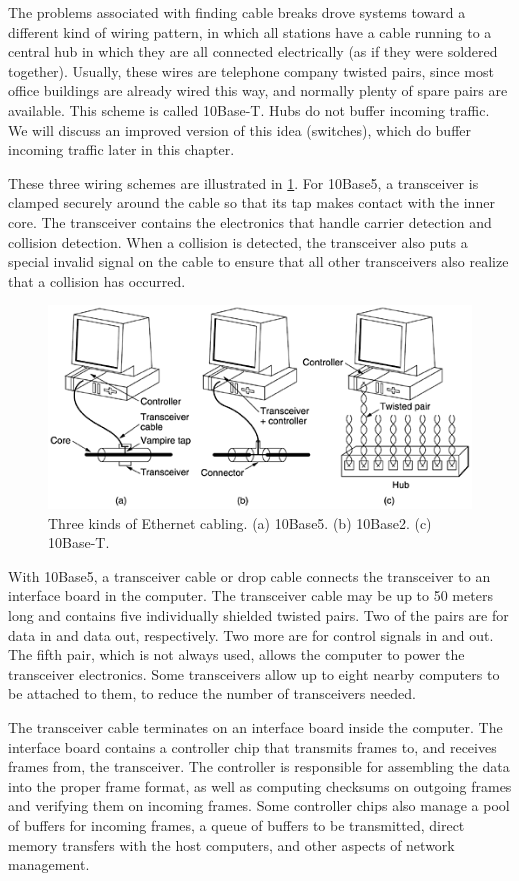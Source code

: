\documentclass[b5paper,11pt]{memoir}
\begin{document}
The problems associated with finding cable breaks drove systems toward a
different kind of wiring pattern, in which all stations have a cable
running to a central {hub} in which they are all connected electrically
(as if they were soldered together). Usually, these wires are telephone
company twisted pairs, since most office buildings are already wired
this way, and normally plenty of spare pairs are available. This scheme
is called {10Base-T}. Hubs do not buffer incoming traffic. We will
discuss an improved version of this idea (switches), which do buffer
incoming traffic later in this chapter.

These three wiring schemes are illustrated in \cref{fig:three-ethernet-cabling}.
For 10Base5, a {transceiver} is clamped securely around the cable
so that its tap makes contact with the inner core. The transceiver
contains the electronics that handle carrier detection and collision
detection. When a collision is detected, the transceiver also puts a
special invalid signal on the cable to ensure that all other
transceivers also realize that a collision has occurred.


\begin{figure}
   \centering
   \includegraphics[width=.7\textwidth]{images/04fig14.png}
   \caption{Three kinds of Ethernet cabling. (a) 10Base5. (b) 10Base2. (c) 10Base-T.}
   \label{fig:three-ethernet-cabling}
\end{figure}


With 10Base5, a {transceiver cable} or {drop cable} connects the
transceiver to an interface board in the computer. The transceiver cable
may be up to 50 meters long and contains five individually shielded
twisted pairs. Two of the pairs are for data in and data out,
respectively. Two more are for control signals in and out. The fifth
pair, which is not always used, allows the computer to power the
transceiver electronics. Some transceivers allow up to eight nearby
computers to be attached to them, to reduce the number of transceivers
needed.

The transceiver cable terminates on an interface board inside the
computer. The interface board contains a controller chip that transmits
frames to, and receives frames from, the transceiver. The controller is
responsible for assembling the data into the proper frame format, as
well as computing checksums on outgoing frames and verifying them on
incoming frames. Some controller chips also manage a pool of buffers for
incoming frames, a queue of buffers to be transmitted, direct memory
transfers with the host computers, and other aspects of network
management.
\end{document}
